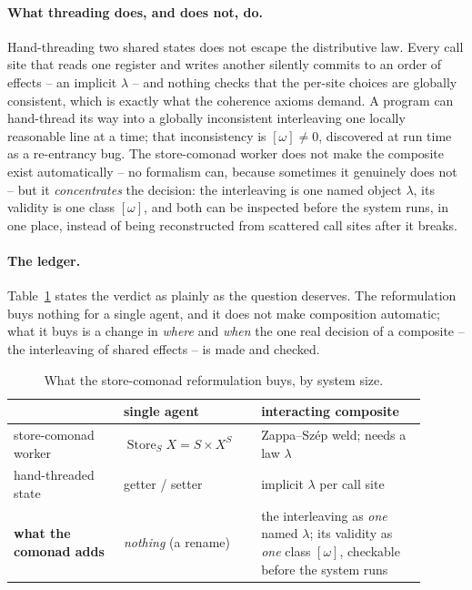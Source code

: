 \documentclass[11pt]{amsart}
\DeclareMathOperator{\Store}{Store}
\theoremstyle{plain}
\theoremstyle{definition}
\theoremstyle{remark}
\begin{document}
\paragraph{What threading does, and does not, do.}
Hand-threading two shared states does not escape the distributive law. Every call site that reads one
register and writes another silently commits to an order of effects -- an implicit $\lambda$ -- and
nothing checks that the per-site choices are globally consistent, which is exactly what the coherence
axioms demand. A program can hand-thread its way into a globally inconsistent interleaving one locally
reasonable line at a time; that inconsistency is $[\omega]\ne0$, discovered at run time as a
re-entrancy bug. The store-comonad worker does not make the composite exist automatically -- no
formalism can, because sometimes it genuinely does not -- but it \emph{concentrates} the decision: the
interleaving is one named object $\lambda$, its validity is one class $[\omega]$, and both can be
inspected before the system runs, in one place, instead of being reconstructed from scattered call
sites after it breaks.

\paragraph{The ledger.}
Table~\ref{tab:ledger} states the verdict as plainly as the question deserves. The reformulation buys
nothing for a single agent, and it does not make composition automatic; what it buys is a change in
\emph{where} and \emph{when} the one real decision of a composite -- the interleaving of shared
effects -- is made and checked.

\begin{table}[t]
\small
\begin{tabular}{@{}p{0.24\linewidth}p{0.30\linewidth}p{0.36\linewidth}@{}}
\toprule
 & \textbf{single agent} & \textbf{interacting composite} \\
\midrule
store-comonad worker & $\Store_S X=S\times X^S$ & Zappa--Sz\'ep weld; needs a law $\lambda$ \\
hand-threaded state & getter / setter & implicit $\lambda$ per call site \\
\textbf{what the comonad adds} & \emph{nothing} (a rename) & the interleaving as \emph{one} named
$\lambda$; its validity as \emph{one} class $[\omega]$, checkable before the system runs \\
\bottomrule
\end{tabular}
\medskip
\caption{What the store-comonad reformulation buys, by system size.}\label{tab:ledger}
\end{table}
\end{document}
